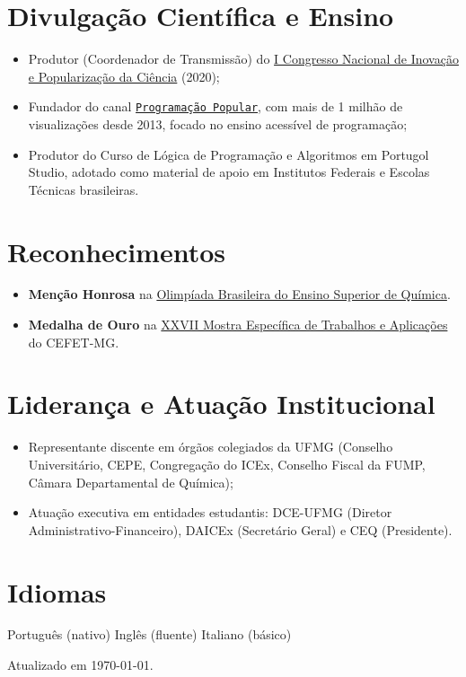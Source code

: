 \documentclass[10pt,a4paper]{article}
\newcommand*{\link}[2]{\href{#1}{{\texttt{#2}}}}
\begin{document}
\section*{Divulgação Científica e Ensino}
\begin{itemize}
  \item Produtor (Coordenador de Transmissão) do \href{https://repositorio.ufmg.br/bitstream/1843/50717/1/I%20Congresso%20Nacional%20de%20Inova%C3%A7%C3%A3o%20e%20Populariza%C3%A7%C3%A3o%20da%20Ci%C3%AAncia%20a%C3%A7%C3%B5es%20durante%20a%20covid-19.pdf}{I Congresso Nacional de Inovação e Popularização da Ciência} (2020);
  \item Fundador do canal \link{https://www.youtube.com/channel/UCsXyoSkpyZB741fkBKeEovQ}{Programação Popular}, com mais de 1 milhão de visualizações desde 2013, focado no ensino acessível de programação;
  \item Produtor do Curso de Lógica de Programação e Algoritmos em Portugol Studio, adotado como material de apoio em Institutos Federais e Escolas Técnicas brasileiras.
\end{itemize}

\section*{Reconhecimentos}
\begin{itemize}
  \item \textbf{Menção Honrosa} na \href{https://obesq.obquimica.org}{Olimpíada Brasileira do Ensino Superior de Química}.
  \item \textbf{Medalha de Ouro} na \href{https://www.meta2017.cefetmg.br}{XXVII Mostra Específica de Trabalhos e Aplicações} do CEFET-MG.
\end{itemize}

\section*{Liderança e Atuação Institucional}
\begin{itemize}
  \item Representante discente em órgãos colegiados da UFMG (Conselho Universitário, CEPE, Congregação do ICEx, Conselho Fiscal da FUMP, Câmara Departamental de Química);
  \item Atuação executiva em entidades estudantis: DCE-UFMG (Diretor Administrativo-Financeiro), DAICEx (Secretário Geral) e CEQ (Presidente).
\end{itemize}

\section*{Idiomas}
Português (nativo) \textbar{} Inglês (fluente) \textbar{} Italiano (básico)

\begin{flushright}\scriptsize%
Atualizado em \today.%
\end{flushright}
\end{document}

